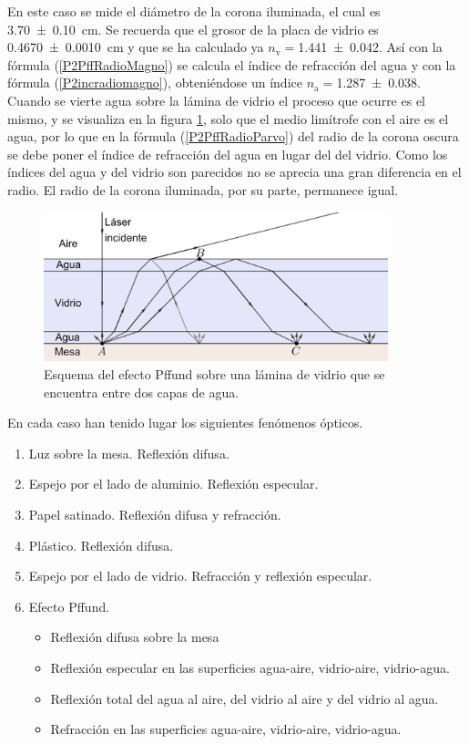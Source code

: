 \documentclass[12pt]{article}
\numberwithin{table}{section}
\numberwithin{figure}{section}
\numberwithin{equation}{section}
\newcommand{\data}[3]{\SI{#1 \pm #2}{#3}}
\begin{document}
En este caso se mide el diámetro de la corona iluminada, el cual es \data{3.70}{0.10}{cm}. Se recuerda que el grosor de la placa de vidrio es \data{0.4670}{0.0010}{cm} y que se ha calculado ya $n_{\text{v}}=$\data{1.441}{0.042}{}. Así con la fórmula (\ref{P2PffRadioMagno}) se calcula el índice de refracción del agua y con la fórmula (\ref{P2incradiomagno}), obteniéndose un índice $n_{\text{a}}=$\data{1.287}{0.038}{}.
\\

Cuando se vierte agua sobre la lámina de vidrio el proceso que ocurre es el mismo, y se visualiza en la figura \ref{P2PffAgria}, solo que el medio limítrofe con el aire es el agua, por lo que en la fórmula (\ref{P2PffRadioParvo}) del radio de la corona oscura se debe poner el índice de refracción del agua en lugar del del vidrio. Como los índices del agua y del vidrio son parecidos no se aprecia una gran diferencia en el radio. El radio de la corona iluminada, por su parte, permanece igual.

\begin{figure}[!ht]
	\small \centering \sffamily
	\begin{center}
		\includegraphics[width=10cm]{P2PffAgria.png}
		\caption{Esquema del efecto Pffund sobre una lámina de vidrio que se encuentra entre dos capas de agua.}
		\label{P2PffAgria}
	\end{center}
\end{figure}

En cada caso han tenido lugar los siguientes fenómenos ópticos.
\begin{enumerate}
	\item Luz sobre la mesa. Reflexión difusa.
	\item Espejo por el lado de aluminio. Reflexión especular.
	\item Papel satinado. Reflexión difusa y refracción.
	\item Plástico. Reflexión difusa.
	\item Espejo por el lado de vidrio. Refracción y reflexión especular.
	\item Efecto Pffund.
		\begin{itemize}
			\item Reflexión difusa sobre la mesa
			\item Reflexión especular en las superficies agua-aire, vidrio-aire, vidrio-agua.
			\item Reflexión total del agua al aire, del vidrio al aire y del vidrio al agua.
			\item Refracción en las superficies agua-aire, vidrio-aire, vidrio-agua.
		\end{itemize}
\end{enumerate}
\end{document}
